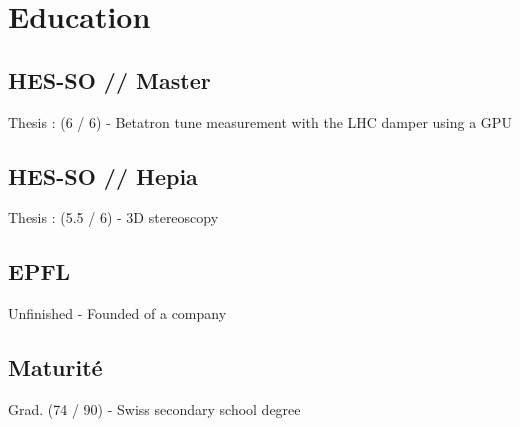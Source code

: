 \documentclass[a4paper]{deedy-resume} %
\begin{document}
\begin{minipage}[t]{0.33\textwidth} %


\section{Education}


\subsection{HES-SO // Master}
	Thesis : (6 / 6) - Betatron tune measurement with the LHC damper using a GPU \\

\sectionspace %


\subsection{HES-SO // Hepia}
	Thesis : (5.5 / 6) - 3D stereoscopy \\

\sectionspace %


\subsection{EPFL}
	Unfinished - Founded of a company \\

\sectionspace


\subsection{Maturité}
	Grad. (74 / 90) - Swiss secondary school degree \\


\end{minipage}
\end{document}
